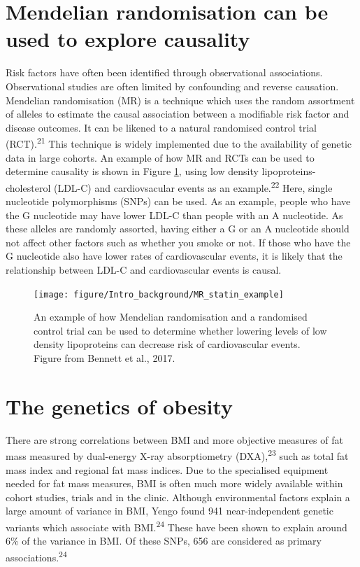 \documentclass[11pt,twoside]{bristolthesis}
\begin{document}
\hypertarget{mendelian-randomisation-can-be-used-to-explore-causality}{%
\section{Mendelian randomisation can be used to explore causality}\label{mendelian-randomisation-can-be-used-to-explore-causality}}

Risk factors have often been identified through observational associations. Observational studies are often limited by confounding and reverse causation. Mendelian randomisation (MR) is a technique which uses the random assortment of alleles to estimate the causal association between a modifiable risk factor and disease outcomes. It can be likened to a natural randomised control trial (RCT).\textsuperscript{21} This technique is widely implemented due to the availability of genetic data in large cohorts. An example of how MR and RCTs can be used to determine causality is shown in Figure \ref{fig:MR-statins}, using low density lipoproteins-cholesterol (LDL-C) and cardiovsacular events as an example.\textsuperscript{22} Here, single nucleotide polymorphisms (SNPs) can be used. As an example, people who have the G nucleotide may have lower LDL-C than people with an A nucleotide. As these alleles are randomly assorted, having either a G or an A nucleotide should not affect other factors such as whether you smoke or not. If those who have the G nucleotide also have lower rates of cardiovascular events, it is likely that the relationship between LDL-C and cardiovascular events is causal.
\begin{figure}
\texttt{[image: figure/Intro\_background/MR\_statin\_example]} \caption[Mendelian randomisation example using LDL levels and cardiovascular events]{An example of how Mendelian randomisation and a randomised control trial can be used to determine whether lowering levels of low density lipoproteins can decrease risk of cardiovascular events. Figure from Bennett et al., 2017.}\label{fig:MR-statins}
\end{figure}
\hypertarget{the-genetics-of-obesity}{%
\section{The genetics of obesity}\label{the-genetics-of-obesity}}

There are strong correlations between BMI and more objective measures of fat mass measured by dual-energy X-ray absorptiometry (DXA),\textsuperscript{23} such as total fat mass index and regional fat mass indices. Due to the specialised equipment needed for fat mass measures, BMI is often much more widely available within cohort studies, trials and in the clinic. Although environmental factors explain a large amount of variance in BMI, Yengo found 941 near-independent genetic variants which associate with BMI.\textsuperscript{24} These have been shown to explain around 6\% of the variance in BMI. Of these SNPs, 656 are considered as primary associations.\textsuperscript{24}
\end{document}
